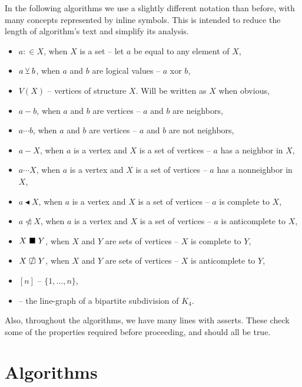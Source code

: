 In the following algorithms we use a slightly different notation than before, with many concepts represented by inline symbols. This is intended to reduce the length of algorithm's text and simplify its analysis.

\begin{itemize}
	\item $a :\in X$, when $X$ is a set -- let $a$ be equal to any element of $X$,
	\item $a \veebar b$, when $a$ and $b$ are logical values -- $a$ xor $b$,
	\item $V(X)$ -- vertices of structure $X$. Will be written as $X$ when obvious,
	\item $a - b$, when $a$ and $b$ are vertices -- $a$ and $b$ are neighbors,
	\item $a \cdots b$, when $a$ and $b$ are vertices -- $a$ and $b$ are not neighbors,
	\item $a - X$, when $a$ is a vertex and $X$ is a set of vertices -- $a$ has a neighbor in $X$,
	\item $a \cdots X$, when $a$ is a vertex and $X$ is a set of vertices -- $a$ has a nonneighbor in $X$,
	\item $a \blacktriangleleft  X$, when $a$ is a vertex and $X$ is a set of vertices -- $a$ is complete to $X$,
	\item $a \ntriangleleft X$, when $a$ is a vertex and $X$ is a set of vertices -- $a$ is anticomplete to $X$,
	\item $X \ \blacksquare\  Y$, when $X$ and $Y$ are sets of vertices -- $X$ is complete to $Y$,
	\item $X \setAntiComplete Y$, when $X$ and $Y$ are sets of vertices -- $X$ is anticomplete to $Y$,
	\item $[n]$  -- $\{1, \ldots, n\}$,
	\item \LGBSK -- the line-graph of a bipartite subdivision of $K_4$.
\end{itemize}

Also, throughout the algorithms, we have many lines with asserts. These check some of the properties required before proceeding, and should all be true.

\clearpage
\section{Algorithms}


\clearpage

